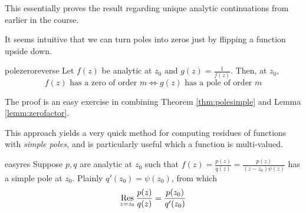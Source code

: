 This essentially proves the result regarding unique analytic continuations from earlier in the course.

\goodbreak


It seems intuitive that we can turn poles into zeros just by flipping a function upside down.

\begin{thm}{}{polezeroreverse}
Let $f(z)$ be analytic at $z_0$ and $g(z)=\frac 1{f(z)}$. Then, at $z_0$,\vspace{-2pt}
\[f(z)\text{ has a zero of order }m\iff g(z)\text{ has a pole of order }m\] 
\end{thm}

The proof is an easy exercise in combining Theorem \ref{thm:polesimple} and Lemma \ref{lemm:zerofactor}.\smallbreak


This approach yields a very quick method for computing residues of functions with \emph{simple poles,} and is particularly useful which a function is multi-valued.

\begin{cor}{}{easyres}
Suppose $p,q$ are analytic at $z_0$ such that $f(z)=\frac{p(z)}{q(z)}=\frac{p(z)}{(z-z_0)\psi(z)}$ has a simple pole at $z_0$. Plainly $q'(z_0)=\psi(z_0)$, from which\vspace{-2pt}
\[\operatorname*{Res}_{z=z_0}\frac{p(z)}{q(z)} =\frac{p(z_0)}{q'(z_0)}\]
\end{cor}

